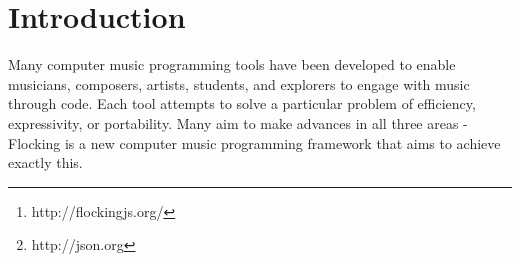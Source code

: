 \documentclass{article}
\title{\papertitle}
\begin{document}
\sloppy
%
\capstartfalse
\maketitle
\capstarttrue
%
\begin{abstract}
Flocking\footnote{http://flockingjs.org/} is a framework for audio synthesis and music composition written in JavaScript. It takes a unique approach to solving several of the common architectural problems faced by computer music environments, emphasizing a declarative style that is closely aligned with the principles of the web.

In Flocking, instruments and scores are defined as JavaScript Object Notation (JSON) objects. JSON is a subset of the JavaScript language that is used widely across the web for exchanging data.\footnote{http://json.org} Flocking's goal is to enable the growth of an ecosystem of tools that can easily parse and understand the logic and semantics of digital instruments by representing the basic building blocks of synthesis declaratively. This is particularly useful for supporting generative composition (where programs generate new instruments and scores algorithmically), graphical tools (for programmers and non-programmers alike to collaborate), and new modes of social programming that allow musicians to easily adapt, extend, and rework existing instruments without having to ``fork" their code.

Flocking provides a robust, optimized, and well-tested architecture that explicitly supports extensibility and long-term growth. Flocking runs in nearly any modern JavaScript environment, including desktop and mobile browsers (Chrome, Firefox, and Safari), as well as on embedded devices with Node.js.

\end{abstract}

\section{Introduction}\label{sec:introduction}

Many computer music programming tools have been developed to enable musicians, composers, artists, students, and explorers to engage with music through code. Each tool attempts to solve a particular problem of efficiency, expressivity, or portability. Many aim to make advances in all three areas - Flocking is a new computer music programming framework that aims to achieve exactly this.
\end{document}
